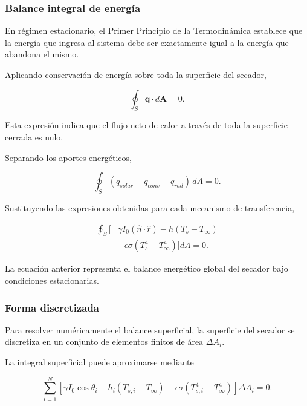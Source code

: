 \subsubsection{Balance integral de energía}

En régimen estacionario, el Primer Principio de la Termodinámica establece que la energía que ingresa al sistema debe ser exactamente igual a la energía que abandona el mismo.

Aplicando conservación de energía sobre toda la superficie del secador,

\begin{equation}
\oint_S
\mathbf q
\cdot
d\mathbf A
=
0.
\end{equation}

Esta expresión indica que el flujo neto de calor a través de toda la superficie cerrada es nulo.

Separando los aportes energéticos,

\begin{equation}
\oint_S
\left(
q_{solar}
-
q_{conv}
-
q_{rad}
\right)
\,dA
=
0.
\label{eq:globalbalance}
\end{equation}

Sustituyendo las expresiones obtenidas para cada mecanismo de transferencia,

\begin{align}
\oint_S
\Big[
&
\gamma I_0
(\hat n\cdot\hat r)
-
h(T_s-T_\infty)
\nonumber\\
&
-
\epsilon\sigma
(T_s^4-T_\infty^4)
\Big]
dA
=
0.
\label{eq:integralbalance}
\end{align}

La ecuación anterior representa el balance energético global del secador bajo condiciones estacionarias.

\subsubsection{Forma discretizada}

Para resolver numéricamente el balance superficial, la superficie del secador se discretiza en un conjunto de elementos finitos de área $\Delta A_i$.

La integral superficial puede aproximarse mediante

\begin{equation}
\sum_{i=1}^{N}
\left[
\gamma I_0
\cos\theta_i
-
h_i(T_{s,i}-T_\infty)
-
\epsilon\sigma
(T_{s,i}^4-T_\infty^4)
\right]
\Delta A_i
=
0.
\end{equation}

